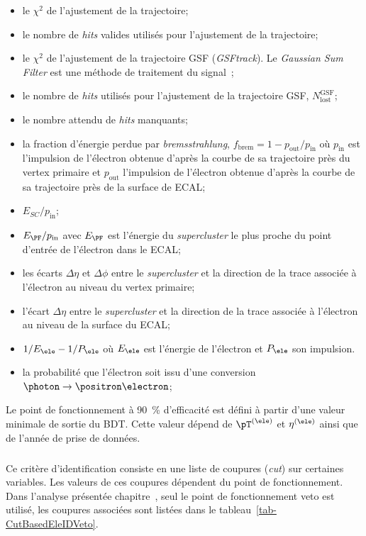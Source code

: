 \begin{itemize}
\item le $\chi^2$ de l'ajustement de la trajectoire;
\item le nombre de \emph{hits} valides utilisés pour l'ajustement de la trajectoire;
\item le $\chi^2$ de l'ajustement de la trajectoire GSF (\emph{GSFtrack}). Le \emph{Gaussian Sum Filter} est une méthode de traitement du signal~\cite{GSF};
\item le nombre de \emph{hits} utilisés pour l'ajustement de la trajectoire GSF, $N_\text{lost}^\text{GSF}$;
\item le nombre attendu de \emph{hits} manquants;
\item la fraction d'énergie perdue par \emph{bremsstrahlung}, $f_\text{brem} = 1-p_\text{out}/p_\text{in}$ où
$p_\text{in}$ est l'impulsion de l'électron obtenue d'après la courbe de sa trajectoire près du vertex primaire et
$p_\text{out}$ l'impulsion de l'électron obtenue d'après la courbe de sa trajectoire près de la surface de ECAL;

\item $E_{SC}/p_\text{in}$;
\item $E_{\PF}/p_\text{in}$ avec $E_{\PF}$ est l'énergie du \emph{supercluster} le plus proche du point d'entrée de l'électron dans le ECAL;
\item les écarts $\Delta\eta$ et $\Delta\phi$ entre le \emph{supercluster} et la direction de la trace associée à l'électron au niveau du vertex primaire;
\item l'écart $\Delta\eta$ entre le \emph{supercluster} et la direction de la trace associée à l'électron au niveau de la surface du ECAL;
\item $1/E_{\ele}-1/P_{\ele}$ où $E_{\ele}$ est l'énergie de l'électron et $P_{\ele}$ son impulsion.

\item la probabilité que l'électron soit issu d'une conversion $\photon\to\positron\electron$;
\end{itemize}
\par
Le point de fonctionnement à \SI{90}{\%} d'efficacité est défini à partir d'une valeur minimale de sortie du BDT.
Cette valeur dépend de $\pT^{(\ele)}$ et $\eta^{(\ele)}$ ainsi que de l'année de prise de données.
\subparagraph{\CutBasedEleID}
Ce critère d'identification consiste en une liste de coupures (\emph{cut}) sur certaines variables.
Les valeurs de ces coupures dépendent du point de fonctionnement.
Dans l'analyse présentée chapitre~, seul le point de fonctionnement \og veto \fg{} est utilisé, les coupures associées sont listées dans le tableau~\ref{tab-CutBasedEleIDVeto}.
